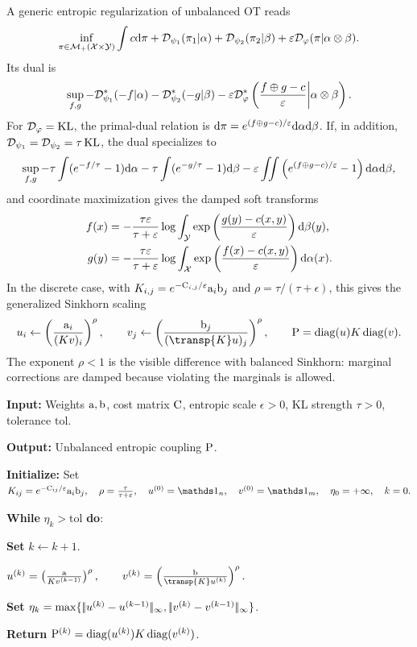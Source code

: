 A generic entropic regularization of unbalanced OT reads
\[
	\inf_{\pi\in\Mm_+(\Xx\times\Yy)}
	\int c\d\pi
	+
	\Dd_{\psi_1}(\pi_1|\al)
	+
	\Dd_{\psi_2}(\pi_2|\be)
	+
	\epsilon\Dd_\phi(\pi|\al\otimes\be).
\]
Its dual is
\[
	\sup_{f,g}
	-
	\Dd_{\psi_1}^*(-f|\al)
	-
	\Dd_{\psi_2}^*(-g|\be)
	-
	\epsilon\Dd_\phi^*\left(\frac{f\oplus g-c}{\epsilon}\middle|\al\otimes\be\right).
\]
For $\Dd_\phi=\KL$, the primal-dual relation is $\d\pi=e^{(f\oplus g-c)/\epsilon}\d\al\d\be$. If, in addition, $\Dd_{\psi_1}=\Dd_{\psi_2}=\tau\KL$, the dual specializes to
\[
	\sup_{f,g}
	-\tau\int(e^{-f/\tau}-1)\d\al
	-\tau\int(e^{-g/\tau}-1)\d\be
	-\epsilon\iint
	\left(e^{(f\oplus g-c)/\epsilon}-1\right)
	\d\al\d\be,
\]
and coordinate maximization gives the damped soft transforms
\begin{align*}
	f(x)
	&=
	-
	\frac{\tau\epsilon}{\tau+\epsilon}
	\log\int_{\Yy}
	\exp\left(\frac{g(y)-c(x,y)}{\epsilon}\right)\d\be(y),\\
	g(y)
	&=
	-
	\frac{\tau\epsilon}{\tau+\epsilon}
	\log\int_{\Xx}
	\exp\left(\frac{f(x)-c(x,y)}{\epsilon}\right)\d\al(x).
\end{align*}
In the discrete case, with $K_{i,j}=e^{-\C_{i,j}/\epsilon}\a_i\b_j$ and $\rho=\tau/(\tau+\epsilon)$, this gives the generalized Sinkhorn scaling
\[
	u_i\leftarrow \left(\frac{\a_i}{(K v)_i}\right)^\rho,
	\qquad
	v_j\leftarrow \left(\frac{\b_j}{(\transp{K}u)_j}\right)^\rho,
	\qquad
	\P=\diag(u)K\diag(v).
\]
The exponent $\rho<1$ is the visible difference with balanced Sinkhorn: marginal corrections are damped because violating the marginals is allowed.

\begin{alg}\label{alg:unbalanced-sinkhorn}
\textbf{Input:} Weights $\a,\b$, cost matrix $\C$, entropic scale $\epsilon>0$, KL strength $\tau>0$, tolerance $\mathrm{tol}$.

\textbf{Output:} Unbalanced entropic coupling $\P$.

\textbf{Initialize:} Set
\(K_{ij}=e^{-\C_{ij}/\epsilon}\a_i\b_j, \quad \rho=\frac{\tau}{\tau+\epsilon}, \quad u^{(0)}=\ones_n, \quad v^{(0)}=\ones_m, \quad \eta_0=+\infty, \quad k=0.\)

\textbf{While} \(\eta_k>\mathrm{tol}\) \textbf{do}:
\begin{algblock}

\textbf{Set} \(k\leftarrow k+1\).

\(u^{(k)} = \left(\frac{\a}{K v^{(k-1)}}\right)^\rho, \qquad v^{(k)} = \left(\frac{\b}{\transp{K}u^{(k)}}\right)^\rho.\)

\textbf{Set} \(\eta_k=\max\{\norm{u^{(k)}-u^{(k-1)}}_\infty,\norm{v^{(k)}-v^{(k-1)}}_\infty\}\).
\end{algblock}
\algreturnskip
\textbf{Return} \(\P^{(k)}=\diag(u^{(k)})K\diag(v^{(k)})\).
\end{alg}
